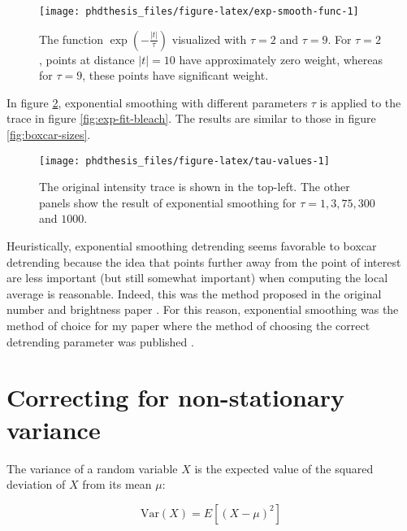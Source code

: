 \documentclass[12pt,]{book}
\theoremstyle{definition}
\theoremstyle{definition}
\theoremstyle{definition}
\theoremstyle{remark}
\let\BeginKnitrBlock\begin \let\EndKnitrBlock\end
\begin{document}
\begin{figure}

\texttt{[image: phdthesis\_files/figure-latex/exp-smooth-func-1]} \hfill{}

\caption{The function \(\exp(-\frac{|t|}{\tau})\)
visualized with \(\tau = 2\) and \(\tau = 9\). For \(\tau = 2\), points
at distance \(|t| = 10\) have approximately zero weight, whereas for
\(\tau = 9\), these points have significant weight.}\label{fig:exp-smooth-func}
\end{figure}

In figure \ref{fig:tau-values}, exponential smoothing with different
parameters \(\tau\) is applied to the trace in figure
\ref{fig:exp-fit-bleach}. The results are similar to those in figure
\ref{fig:boxcar-sizes}.





\begin{figure}

\texttt{[image: phdthesis\_files/figure-latex/tau-values-1]} \hfill{}

\caption{The original intensity trace is shown in the
top-left. The other panels show the result of exponential smoothing for
\(\tau = 1, 3, 75, 300\) and \(1000\).}\label{fig:tau-values}
\end{figure}

Heuristically, exponential smoothing detrending seems favorable to
boxcar detrending because the idea that points further away from the
point of interest are less important (but still somewhat important) when
computing the local average is reasonable. Indeed, this was the method
proposed in the original number and brightness paper \citep{NB}. For
this reason, exponential smoothing was the method of choice for my paper
where the method of choosing the correct detrending parameter was
published \citep{nandb}.

\section{Correcting for non-stationary
variance}\label{correcting-for-non-stationary-variance}

\BeginKnitrBlock{definition}
\protect\hypertarget{def:unnamed-chunk-35}{}{\label{def:unnamed-chunk-35}
}The variance of a random variable \(X\) is the expected value of the
squared deviation of \(X\) from its mean \(\mu\):

\begin{equation}
\text{Var}(X) = E[(X - \mu)^2]
\label{eq:variance}
\end{equation}
\EndKnitrBlock{definition}
\end{document}
